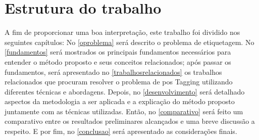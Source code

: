\section{Estrutura do trabalho}\label{sec:estruturadotrabalho}

A fim de proporcionar uma boa interpretação, este trabalho foi dividido nos seguintes capítulos: No \autoref{oproblema} será descrito o problema de etiquetagem. No \autoref{fundamentos} será mostrados os principais fundamentos necessários para entender o método proposto e seus conceitos relacionados; após passar os fundamentos, será apresentado no \autoref{trabalhosrelacionados} os trabalhos relacionados que procuram resolver o problema de \ac{pos} Tagging utilizando diferentes técnicas e abordagens. Depois, no \autoref{desenvolvimento} será detalhado aspectos da metodologia a ser aplicada e a explicação do método proposto juntamente com as técnicas utilizadas. Então, no \autoref{comparativo} será feito um comparativo entre os resultados preliminares alcançados e uma breve discussão a respeito. E por fim, no \autoref{conclusao} será apresentado as considerações finais.
